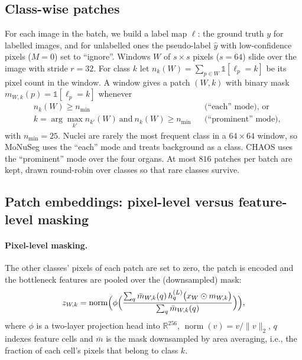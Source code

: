 \documentclass[11pt]{article}
\newcommand{\nrm}{\operatorname{norm}}
\begin{document}
\subsection{Class-wise patches}
\label{sec:patches}

For each image in the batch, we build a label map $\ell$: the ground truth $y$ for labelled images, and for unlabelled ones the pseudo-label $\hat y$ with low-confidence pixels ($M=0$) set to ``ignore''. Windows $W$ of $s\times s$ pixels ($s=64$) slide over the image with stride $r=32$. For class $k$ let $n_k(W)=\sum_{p\in W}\mathbb{1}[\ell_p=k]$ be its pixel count in the window. A window gives a patch $(W,k)$ with binary mask $m_{W,k}(p)=\mathbb{1}[\ell_p=k]$ whenever
\begin{equation}
  \begin{aligned}
  &n_k(W)\ge n_{\min} && \text{(``each'' mode), or}\\
  &k=\arg\max_{k'}n_{k'}(W)\ \text{and}\ n_k(W)\ge n_{\min} && \text{(``prominent'' mode),}
  \end{aligned}
  \label{eq:patch}
\end{equation}
with $n_{\min}=25$. Nuclei are rarely the most frequent class in a $64\times64$ window, so MoNuSeg uses the ``each'' mode and treats background as a class. CHAOS uses the ``prominent'' mode over the four organs. At most $816$ patches per batch are kept, drawn round-robin over classes so that rare classes survive.

\subsection{Patch embeddings: pixel-level versus feature-level masking}
\label{sec:embed}

\paragraph{Pixel-level masking.} The other classes' pixels of each patch are set to zero, the patch is encoded and the bottleneck features are pooled over the (downsampled) mask:
\begin{equation}
  z_{W,k}=\nrm\Bigl(\phi\Bigl(\frac{\sum_q \bar m_{W,k}(q)\,h^{(L)}_q\bigl(x_W\odot m_{W,k}\bigr)}{\sum_q \bar m_{W,k}(q)}\Bigr)\Bigr),
  \label{eq:pixelmask}
\end{equation}
where $\phi$ is a two-layer projection head into $\mathbb{R}^{256}$, $\nrm(v)=v/\lVert v\rVert_2$, $q$ indexes feature cells and $\bar m$ is the mask downsampled by area averaging, i.e., the fraction of each cell's pixels that belong to class $k$.
\end{document}
